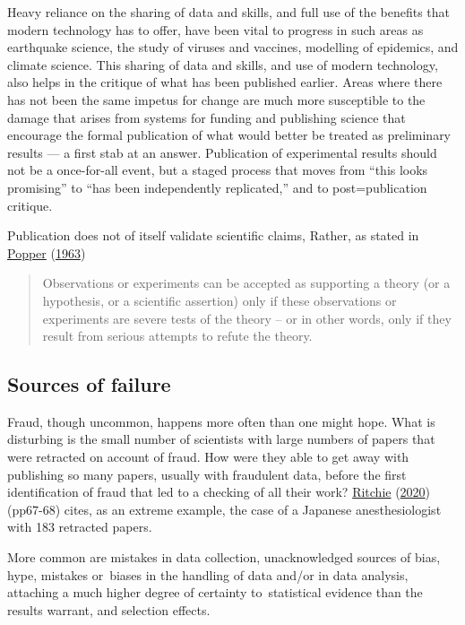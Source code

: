 \documentclass[
  10pt,
  b5paper]{book}
\begin{document}
Heavy reliance on the sharing of data and skills, and full use of
the benefits that modern technology has to offer, have been vital
to progress in such areas as earthquake science, the study of
viruses and vaccines, modelling of epidemics, and climate science.
This sharing of data and skills, and use of modern technology, also
helps in the critique of what has been published earlier.
Areas where there has not been the same impetus for change are much
more susceptible to the damage that arises from systems for funding
and publishing science that encourage the formal publication of
what would better be treated as preliminary results --- a first
stab at an answer. Publication of experimental results should not
be a once-for-all event, but a staged process that moves from
``this looks promising'' to ``has been independently replicated,''
and to post=publication critique.

Publication does not of itself validate scientific claims,
Rather, as stated in \protect\hyperlink{ref-popper_1963}{Popper} (\protect\hyperlink{ref-popper_1963}{1963})

\begin{quote}
Observations or experiments can be accepted as supporting a theory (or a hypothesis, or a scientific assertion) only if these observations or experiments are severe tests of the theory -- or in other words, only if they result from serious attempts to refute the theory.
\end{quote}

\hypertarget{sources-of-failure}{%
\subsection*{Sources of failure}\label{sources-of-failure}}

Fraud, though uncommon, happens more often than one might hope.
What is disturbing is the small number of scientists with
large numbers of papers that were retracted on account of
fraud. How were they able to get away with publishing so
many papers, usually with fraudulent data, before the
first identification of fraud that led to a checking of all
their work? \protect\hyperlink{ref-ritchie2020science}{Ritchie} (\protect\hyperlink{ref-ritchie2020science}{2020}) (pp67-68) cites, as an
extreme example, the case of a Japanese anesthesiologist
with 183 retracted papers.

More common are mistakes in data collection, unacknowledged
sources of bias, hype, mistakes or~biases in the handling of
data and/or in data analysis, attaching a much higher
degree of certainty to~statistical evidence than the results
warrant, and selection effects.
\end{document}
